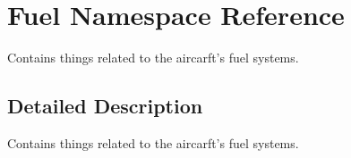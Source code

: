 \hypertarget{namespace_fuel}{\section{Fuel Namespace Reference}
\label{namespace_fuel}
}


Contains things related to the aircarft's fuel systems.  




\subsection{Detailed Description}
Contains things related to the aircarft's fuel systems. 